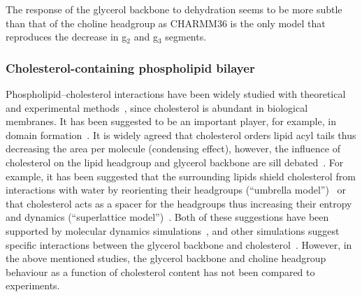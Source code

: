 \documentclass[journal=jacsat,manuscript=article]{achemso}
\begin{document}
The response of the glycerol backbone to dehydration seems to be more subtle than that of the choline headgroup 
as CHARMM36 is the only model that reproduces the decrease in g$_2$ and g$_3$ segments.


\subsubsection{Cholesterol-containing phospholipid bilayer}
Phospholipid--cholesterol interactions have been widely studied with theoretical~\cite{huang99,zhu07,rog09,alwarawrah12} and
experimental methods~\cite{brown78,marsh10,ferreira13,marsh13}, since cholesterol is abundant in biological membranes.
It has been suggested to be an important player, for example, in domain formation~\cite{simons04,somerharju09}.
It is widely agreed that cholesterol orders lipid acyl tails thus decreasing the area per molecule (condensing effect),
however, the influence of cholesterol on the lipid headgroup and glycerol backbone are sill debated~\cite{huang99,simons04,somerharju09}.
For example, it has been suggested that the surrounding lipids shield cholesterol from interactions with water by 
reorienting their headgroups (``umbrella model'')~\cite{huang99} or that cholesterol acts as a spacer for the headgroups thus increasing 
their entropy and dynamics (``superlattice model'')~\cite{somerharju09}. 
Both of these suggestions have been supported
by molecular dynamics simulations~\cite{zhu07,alwarawrah12}, and other simulations suggest specific
interactions between the glycerol backbone and cholesterol~\cite{rog09}. However,
in the above mentioned studies, the glycerol backbone and choline headgroup behaviour
as a function of cholesterol content has not been compared to experiments. 
\end{document}
